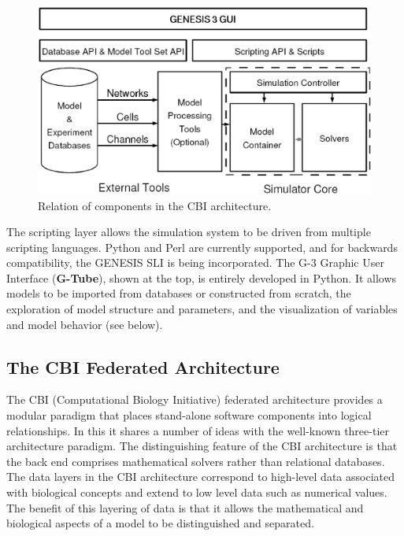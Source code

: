 \documentclass[12pt]{article}
\begin{document}
\begin{figure}[ht]
  \centering
    \includegraphics[scale=0.4]{figures/G3arch.eps}
  \caption{Relation of components in the CBI architecture.}
  \label{fig:cbi-arch}
\end{figure}

The scripting layer allows the simulation system to be driven from
multiple scripting languages. Python and Perl are currently supported,
and for backwards compatibility, the GENESIS SLI is being
incorporated. The G-3 Graphic User Interface ({\bf G-Tube}), shown at the top,
is entirely developed in Python.  It allows models to be imported from
databases or constructed from scratch, the exploration of model
structure and parameters, and the visualization of variables and model
behavior (see below).

\subsection{The CBI Federated Architecture}
The CBI (Computational Biology Initiative) federated architecture
provides a modular paradigm that places stand-alone software
components into logical relationships. In this it shares a number of
ideas with the well-known three-tier architecture paradigm.  The
distinguishing feature of the CBI architecture is that the back end
comprises mathematical solvers rather than relational databases.  The
data layers in the CBI architecture correspond to high-level data
associated with biological concepts and extend to low level data such
as numerical values. The benefit of this layering of data is that it
allows the mathematical and biological aspects of a model to be
distinguished and separated.
\end{document}
